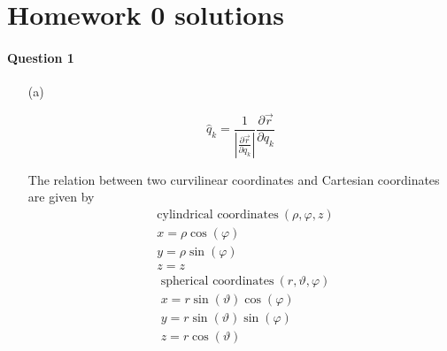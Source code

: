\documentclass[11pt,a4paper]{article}
\author{Zehao Gao}
\begin{document}


\section*{Homework 0 solutions}

\paragraph{Question 1}

\begin{enumerate}
\item[(a)]

\begin{equation}
\hat{q}_k=\frac{1}{|\frac{\partial\vec{r}}{\partial q_k}|}\frac{\partial\vec{r}}{\partial q_k}
\end{equation}

The relation between two curvilinear coordinates and Cartesian coordinates are given by
\begin{align*}
&\textrm{cylindrical coordinates}\ (\rho,\varphi,z)\\
&x=\rho\cos(\varphi)\\
&y=\rho\sin(\varphi)\\
&z=z
\end{align*}
\begin{align*}
&\textrm{spherical coordinates}\ (r,\vartheta,\varphi)\\
&x=r\sin(\vartheta)\cos(\varphi)\\
&y=r\sin(\vartheta)\sin(\varphi)\\
&z=r\cos(\vartheta)
\end{align*}


\end{enumerate}
\end{document}
